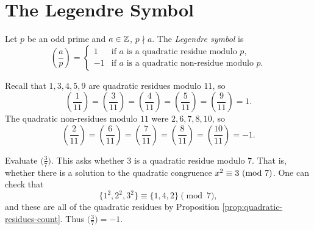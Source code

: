 \section{The Legendre Symbol}

\begin{definition}
  Let $p$ be an odd prime and
  $a \in \mathbb{Z}$, $p \nmid a$. The
  \emph{Legendre symbol} is
  \[
    \left(\frac{a}{p}\right)
    =
    \begin{cases}
      1 & \text{if $a$ is a quadratic residue modulo $p$,} \\
      -1 & \text{if $a$ is a quadratic non-residue modulo $p$.}
    \end{cases}
  \]
\end{definition}

\begin{example}
  Recall that $1, 3, 4, 5, 9$ are
  quadratic residues modulo $11$, so
  \[
    \left(\frac{1}{11}\right)
    = \left(\frac{3}{11}\right)
    = \left(\frac{4}{11}\right)
    = \left(\frac{5}{11}\right)
    = \left(\frac{9}{11}\right)
    = 1.
  \]
  The quadratic non-residues modulo
  $11$ were $2, 6, 7, 8, 10$, so
  \[
    \left(\frac{2}{11}\right)
    = \left(\frac{6}{11}\right)
    = \left(\frac{7}{11}\right)
    = \left(\frac{8}{11}\right)
    = \left(\frac{10}{11}\right)
    = -1.
  \]
\end{example}

\begin{example}
  Evaluate $\big(\frac{3}{7}\big)$.
  This asks whether $3$ is a quadratic
  residue modulo $7$. That is, whether
  there is a solution to the
  quadratic congruence
  $x^2 \equiv 3 \ (\mathrm{mod}\ 7)$. One can check
  that
  \[
    \{
      1^2, 2^2, 3^2
    \}
    \equiv \{1, 4, 2\} \pmod{7},
  \]
  and these are all of the quadratic
  residues by Proposition
  \ref{prop:quadratic-residues-count}.
  Thus $\big(\frac{3}{7}\big) = -1$.
\end{example}
